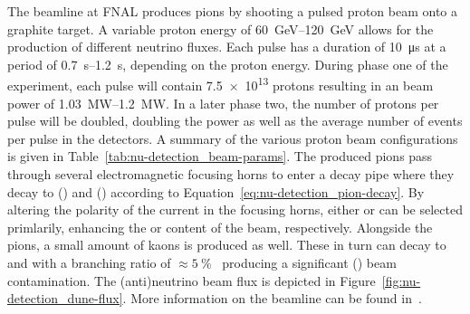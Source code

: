 The beamline at FNAL produces pions by shooting a pulsed proton beam onto a graphite target.
A variable proton energy of \SIrange{60}{120}{\giga\electronvolt} allows for the production of different neutrino fluxes.
Each pulse has a duration of \SI{10}{\micro\second} at a period of \SIrange{0.7}{1.2}{\second}, depending on the proton energy.
During phase one of the experiment, each pulse will contain \num{7.5e13} protons resulting in an beam power of \SIrange{1.03}{1.2}{\mega\watt}.
In a later phase two, the number of protons per pulse will be doubled, doubling the power as well as the average number of events per pulse in the detectors.
A summary of the various proton beam configurations is given in Table~\ref{tab:nu-detection_beam-params}.
The produced pions pass through several electromagnetic focusing horns to enter a decay pipe where they decay to \Pgmp(\Pgmm) and \Pgngm(\Pagngm) according to Equation~\eqref{eq:nu-detection_pion-decay}.
By altering the polarity of the current in the focusing horns, either \Pgpp or \Pgpm can be selected primlarily, enhancing the \Pgngm or \Pagngm content of the beam, respectively.
Alongside the pions, a small amount of kaons is produced as well.
These in turn can decay to \Pgne and \Pagne with a branching ratio of $\approx\SI{5}{\percent}$~\cite{pdg} producing a significant \Pgne (\Pagne) beam contamination.
The (anti)neutrino beam flux is depicted in Figure~\ref{fig:nu-detection_dune-flux}.
More information on the beamline can be found in~\cite{dune2}.

